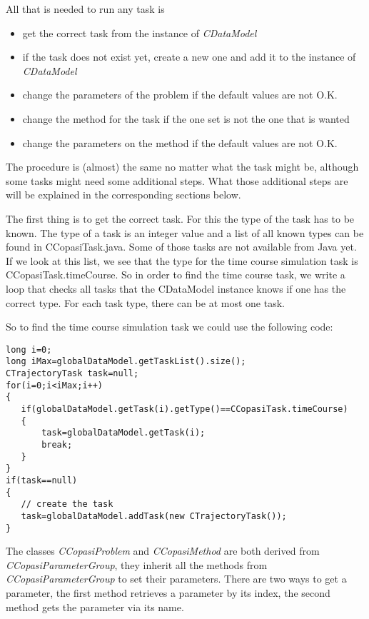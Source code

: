 \documentclass[a4,10pt]{article}
\begin{document}
All that is needed to run any task is 
\begin{itemize}
\item{get the correct task from the instance of \textit{CDataModel}}
\item{if the task does not exist yet, create a new one and add it to the instance of \textit{CDataModel}}
\item{change the parameters of the problem if the default values are not O.K.}
\item{change the method for the task if the one set is not the one that is wanted}
\item{change the parameters on the method if the default values are not O.K.}
\end{itemize}

The procedure is (almost) the same no matter what the task might be, although some tasks might need some additional steps. What those additional steps are will be explained in the corresponding sections below.   

The first thing is to get the correct task. For this the type of the task has to be known. The type of a task is an integer value and a list of all known types can be found in CCopasiTask.java. Some of those tasks are not available from Java yet. If we look at this list, we see that the type for the time course simulation task is CCopasiTask.timeCourse. So in order to find the time course task, we write a loop that checks all tasks that the CDataModel instance knows if one has the correct type. For each task type, there can be at most one task.

So to find the time course simulation task we could use the following code:

\begin{lstlisting}
long i=0;
long iMax=globalDataModel.getTaskList().size();
CTrajectoryTask task=null;
for(i=0;i<iMax;i++)
{
   if(globalDataModel.getTask(i).getType()==CCopasiTask.timeCourse)
   {
       task=globalDataModel.getTask(i);
       break;
   }
}
if(task==null)
{
   // create the task
   task=globalDataModel.addTask(new CTrajectoryTask());
}
\end{lstlisting}

The classes \textit{CCopasiProblem} and \textit{CCopasiMethod} are both derived from \textit{CCopasiParameterGroup}, they inherit all the methods from \textit{CCopasiParameterGroup} to set their parameters.
There are two ways to get a parameter, the first method retrieves a parameter by its index, the second method gets the parameter via its name.
\end{document}
